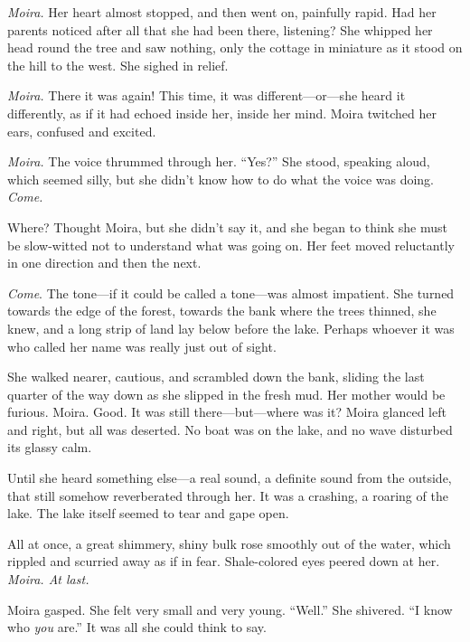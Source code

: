 \documentclass[letterpaper, twoside, 12pt]{memoir}
\begin{document}
\textit{Moira.}
Her heart almost stopped, and then went on, painfully rapid. Had her parents noticed after all that she had been there, listening? She whipped her head round the tree and saw nothing, only the cottage in miniature as it stood on the hill to the west. She sighed in relief.

\textit{Moira.}
There it was again! This time, it was different---or---she heard it differently, as if it had echoed inside her, inside her mind. Moira twitched her ears, confused and excited.

\textit{Moira.} The voice thrummed through her.
“Yes?” She stood, speaking aloud, which seemed silly, but she didn’t know how to do what the voice was doing.
\textit{Come.}

Where? Thought Moira, but she didn’t say it, and she began to think she must be slow-witted not to understand what was going on. Her feet moved reluctantly in one direction and then the next.

\textit{Come}. The tone---if it could be called a tone---was almost impatient.
She turned towards the edge of the forest, towards the bank where the trees thinned, she knew, and a long strip of land lay below before the lake. Perhaps whoever it was who called her name was really just out of sight.

She walked nearer, cautious, and scrambled down the bank, sliding the last quarter of the way down as she slipped in the fresh mud. Her mother would be furious.
Moira.
Good. It was still there---but---where was it? Moira glanced left and right, but all was deserted. No boat was on the lake, and no wave disturbed its glassy calm.

Until she heard something else---a real sound, a definite sound from the outside, that still somehow reverberated through her. It was a crashing, a roaring of the lake. The lake itself seemed to tear and gape open.

All at once, a great shimmery, shiny bulk rose smoothly out of the water, which rippled and scurried away as if in fear. Shale-colored eyes peered down at her.
\textit{Moira. At last.}

Moira gasped. She felt very small and very young. 
“Well.” She shivered. “I know who \textit{you} are.” It was all she could think to say.
\end{document}
